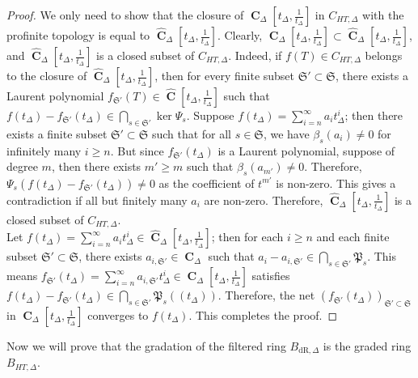 \documentclass{amsart}
\newcommand{\mCHT}{C_{HT,\Delta}}
\DeclareMathOperator{\C}{\textbf{C}}
\newcommand{\mBdr}{B_{\mathrm{dR},\Delta}}
\newcommand{\mBHT}{B_{HT,\Delta}}
\begin{document}
\begin{proof}
    We only need to show that the closure of $\C_\Delta\left[t_\Delta,\frac{1}{t_\Delta}\right]$ in $\mCHT$ with the profinite topology is equal to $\widehat{\C}_\Delta\left[t_\Delta,\frac{1}{t_\Delta}\right]$. Clearly, $\C_\Delta\left[t_\Delta,\frac{1}{t_\Delta}\right]\subset\widehat{\C}_\Delta\left[t_\Delta,\frac{1}{t_\Delta}\right]$, and $\widehat{\C}_\Delta\left[t_\Delta,\frac{1}{t_\Delta}\right]$ is a closed subset of $\mCHT$. Indeed, if $f(T)\in\mCHT$ belongs to the closure of $\widehat{\C}_\Delta\left[t_\Delta,\frac{1}{t_\Delta}\right]$, then for every finite subset $\mathfrak{S}'\subset\mathfrak{S}$, there exists a Laurent polynomial $f_{\mathfrak{S}'}(T)\in\widehat{\C}\left[t_\Delta,\frac{1}{t_\Delta}\right]$ such that $f(t_\Delta)-f_{\mathfrak{S}'}(t_\Delta)\in\bigcap\limits_{s\in\mathfrak{S}'}\ker\Psi_s$. Suppose $f(t_\Delta)=\sum\limits_{i=n}^\infty a_it^i_\Delta$; then there exists a finite subset $\mathfrak{S}'\subset \mathfrak{S}$ such that for all $s\in\mathfrak{S}$, we have $\beta_s(a_i)\neq 0$ for infinitely many $i\geq n$. But since $f_\mathfrak{S'}(t_\Delta)$ is a Laurent polynomial, suppose of degree $m$, then there exists $m'\geq m$ such that $\beta_s(a_{m'})\neq 0$. Therefore, $\Psi_s(f(t_\Delta)-f_{\mathfrak{S}'}(t_\Delta))\neq 0$ as the coefficient of $t^{m'}$ is non-zero. This gives a contradiction if all but finitely many $a_i$ are non-zero. Therefore, $\widehat{\C}_\Delta\left[t_\Delta,\frac{1}{t_\Delta}\right]$ is a closed subset of $\mCHT$.\\

    Let $f(t_\Delta)=\sum\limits_{i=n}^\infty a_it^i_\Delta\in\widehat{\C}_\Delta\left[t_\Delta,\frac{1}{t_\Delta}\right]$; then for each $i\geq n$ and each finite subset $\mathfrak{S}'\subset\mathfrak{S}$, there exists $a_{i,\mathfrak{S}'}\in\C_\Delta$ such that $a_i-a_{i,\mathfrak{S}'}\in\bigcap\limits_{s\in\mathfrak{S}'}\mathfrak{P}_s$. This means $f_{\mathfrak{S}'}(t_\Delta)=\sum\limits_{i=n}^\infty a_{i,\mathfrak{S}'}t^i_\Delta\in \C_\Delta\left[t_\Delta,\frac{1}{t_\Delta}\right]$ satisfies $f(t_\Delta)-f_{\mathfrak{S}'}(t_\Delta)\in\bigcap\limits_{s\in\mathfrak{S}'}\mathfrak{P}_s(\!(t_\Delta)\!)$. Therefore, the net $(f_{\mathfrak{S}'}(t_\Delta))_{\mathfrak{S'}\subset\mathfrak{S}}$ in $\C_\Delta\left[t_\Delta,\frac{1}{t_\Delta}\right]$ converges to $f(t_\Delta)$. This completes the proof.
\end{proof}

Now we will prove that the gradation of the filtered ring $\mBdr$ is the graded ring $\mBHT$.
\end{document}
